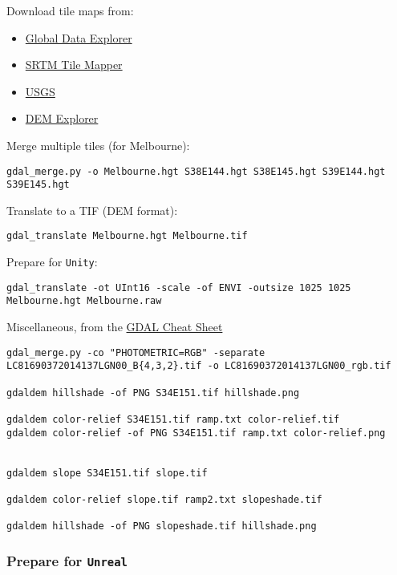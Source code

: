 \documentclass[]{article}
\begin{document}
Download tile maps from:

\begin{itemize}
\itemsep1pt\parskip0pt
\item
  \href{http://gdex.cr.usgs.gov/gdex/}{Global Data Explorer}
\item
  \href{http://dwtkns.com/srtm/}{SRTM Tile Mapper}
\item
  \href{http://dds.cr.usgs.gov/srtm/version2_1/SRTM3/Australia/}{USGS}
\item
  \href{http://ws.csiss.gmu.edu/DEMExplorer/}{DEM Explorer}
\end{itemize}

Merge multiple tiles (for Melbourne):

\begin{verbatim}
gdal_merge.py -o Melbourne.hgt S38E144.hgt S38E145.hgt S39E144.hgt S39E145.hgt
\end{verbatim}

Translate to a TIF (DEM format):

\begin{verbatim}
gdal_translate Melbourne.hgt Melbourne.tif
\end{verbatim}

Prepare for \texttt{Unity}:

\begin{verbatim}
gdal_translate -ot UInt16 -scale -of ENVI -outsize 1025 1025 Melbourne.hgt Melbourne.raw
\end{verbatim}

Miscellaneous, from the
\href{https://github.com/dwtkns/gdal-cheat-sheet}{GDAL Cheat Sheet}

\begin{verbatim}
gdal_merge.py -co "PHOTOMETRIC=RGB" -separate LC81690372014137LGN00_B{4,3,2}.tif -o LC81690372014137LGN00_rgb.tif

gdaldem hillshade -of PNG S34E151.tif hillshade.png

gdaldem color-relief S34E151.tif ramp.txt color-relief.tif
gdaldem color-relief -of PNG S34E151.tif ramp.txt color-relief.png


gdaldem slope S34E151.tif slope.tif 

gdaldem color-relief slope.tif ramp2.txt slopeshade.tif

gdaldem hillshade -of PNG slopeshade.tif hillshade.png
\end{verbatim}

\subsubsection{\texorpdfstring{Prepare for
\texttt{Unreal}}{Prepare for Unreal}}\label{prepare-for-unreal}
\end{document}
